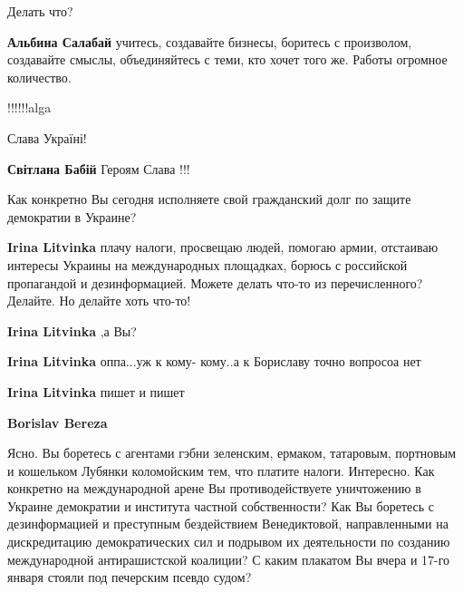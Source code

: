  
 
 
 
 
\zzSecCmt

\begin{itemize} %
Делать что?

\textbf{Альбина Салабай} учитесь, создавайте бизнесы, боритесь с произволом, создавайте смыслы, объединяйтесь с теми, кто хочет того же. Работы огромное количество.

!!!!!!alga

Слава Україні!

\textbf{Світлана Бабій} Героям Слава !!!

Как конкретно Вы сегодня исполняете свой гражданский долг по защите демократии в Украине?

\begin{itemize} %
\textbf{Irina Litvinka} плачу налоги, просвещаю людей, помогаю армии, отстаиваю интересы Украины на международных площадках, борюсь с российской пропагандой и дезинформацией. Можете делать что-то из перечисленного? Делайте. Но делайте хоть что-то!

\textbf{Irina Litvinka} ,а Вы?

\textbf{Irina Litvinka} оппа...уж к кому- кому..а к Бориславу точно вопросоа нет

\textbf{Irina Litvinka} пишет и пишет

\textbf{Borislav Bereza} 

Ясно. Вы боретесь с агентами гэбни зеленским, ермаком, татаровым, портновым и
кошельком Лубянки коломойским тем, что платите налоги. Интересно. Как конкретно
на международной арене Вы противодействуете уничтожению в Украине демократии и
института частной собственности? Как Вы боретесь с дезинформацией и преступным
бездействием Венедиктовой, направленными на дискредитацию демократических сил
и подрывом их деятельности по созданию международной антирашистской коалиции? С
каким плакатом Вы вчера и 17-го января стояли под печерским псевдо судом?



\end{itemize}
\end{itemize}
